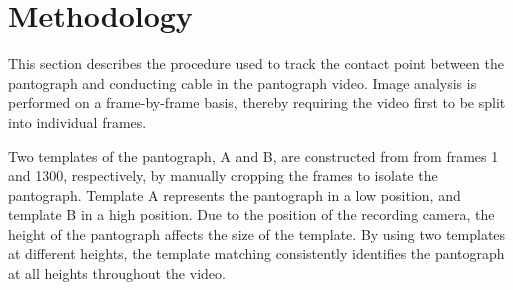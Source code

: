 \newpage
\section{Methodology}

This section describes the procedure used to track the contact point between the pantograph and conducting cable in the pantograph video. Image analysis is performed on a frame-by-frame basis, thereby requiring the video first to be split into individual frames.

Two templates of the pantograph, A and B, are constructed from from frames 1 and 1300, respectively, by manually cropping the frames to isolate the pantograph. Template A represents the pantograph in a low position, and template B in a high position. Due to the position of the recording camera, the height of the pantograph affects the size of the template. By using two templates at different heights, the template matching consistently identifies the pantograph at all heights throughout the video.

